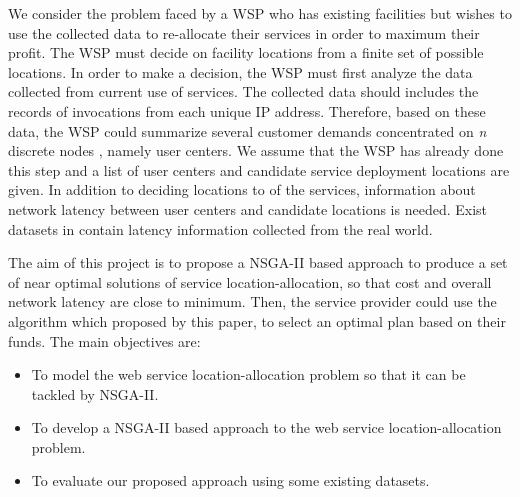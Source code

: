 \documentclass{llncs}
\begin{document}
%
%

We consider the problem faced by a WSP who has existing facilities but wishes to use the collected data to re-allocate their services in order to maximum their profit.
The WSP must decide on facility locations from a finite set of possible locations. 
In order to make a decision, the WSP must first analyze the data collected from current use of services. 
The collected data should includes the records of invocations from each unique IP address.
Therefore, based on these data, the WSP could summarize several customer demands concentrated on \textit{n} discrete nodes \cite{Aboolian}, namely user centers. 
We assume that the WSP has already done this step and a list of user centers and candidate service deployment locations are given.
In addition to deciding locations to of the services, information about network latency between user centers and candidate locations is needed. 
Exist datasets in \cite{6076756} \cite{5552800} contain latency information collected from the real world. 

The aim of this project is to propose a NSGA-II based approach to produce a set of near optimal solutions of service location-allocation, so that cost and overall network latency are 
close to minimum. Then, the service provider could use the algorithm which proposed by this paper, to select an optimal plan based on their funds. 
The main objectives are:
\begin{itemize}
	\item To model the web service location-allocation problem so that it can be tackled by NSGA-II.
	\item To develop a NSGA-II based approach to the web service location-allocation problem.
	\item To evaluate our proposed approach using some existing datasets.
\end{itemize}
\end{document}
